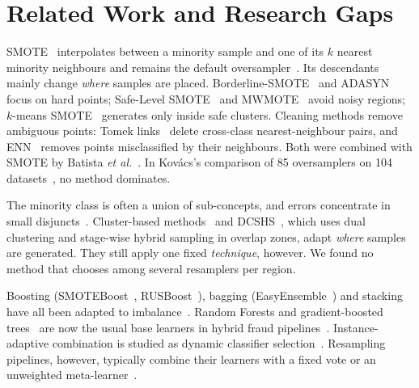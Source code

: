 \section{Related Work and Research Gaps}\label{sec:related}

SMOTE~\cite{chawla2002smote} interpolates between a minority sample and one of its $k$ nearest minority neighbours and
remains the default oversampler~\cite{fernandez2018smote}. Its descendants mainly change \emph{where} samples are
placed. Borderline-SMOTE~\cite{han2005borderline} and ADASYN~\cite{he2008adasyn} focus on hard points; Safe-Level
SMOTE~\cite{bunkhumpornpat2009safe} and MWMOTE~\cite{barua2014mwmote} avoid noisy regions; $k$-means
SMOTE~\cite{douzas2018kmeans} generates only inside safe clusters. Cleaning methods remove ambiguous points:
Tomek links~\cite{tomek1976two} delete cross-class nearest-neighbour pairs, and ENN~\cite{wilson1972asymptotic} removes
points misclassified by their neighbours. Both were combined with SMOTE by Batista \emph{et al.}~\cite{batista2004study}.
In Kov\'{a}cs's comparison of 85 oversamplers on 104 datasets~\cite{kovacs2019empirical}, no method dominates.

The minority class is often a union of sub-concepts, and errors concentrate in small disjuncts~\cite{jo2004class}.
Cluster-based methods~\cite{jo2004class,douzas2018kmeans} and DCSHS~\cite{plan_p2_dcshs}, which uses dual clustering
and stage-wise hybrid sampling in overlap zones, adapt \emph{where} samples are generated. They still apply one fixed
\emph{technique}, however. We found no method that chooses among several resamplers per region.

Boosting (SMOTEBoost~\cite{chawla2003smoteboost}, RUSBoost~\cite{seiffert2010rusboost}), bagging
(EasyEnsemble~\cite{liu2009exploratory}) and stacking~\cite{wolpert1992stacked} have all been adapted to
imbalance~\cite{galar2012review}. Random Forests and gradient-boosted trees~\cite{breiman2001random,chen2016xgboost,
ke2017lightgbm} are now the usual base learners in hybrid fraud pipelines~\cite{plan_p9_fraud,plan_p10_stacking}.
Instance-adaptive combination is studied as dynamic classifier selection~\cite{cruz2018dynamic}. Resampling pipelines,
however, typically combine their learners with a fixed vote or an unweighted meta-learner~\cite{plan_p5_survey}.

